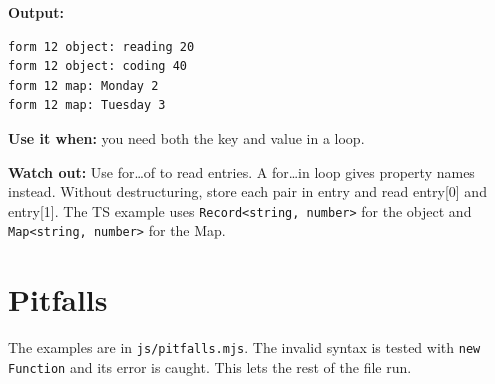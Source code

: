 \documentclass[
  10pt,
  a4paper,
]{article}
\begin{document}

\textbf{Output:}

\begin{minipage}{\linewidth}

\begin{lstlisting}
form 12 object: reading 20
form 12 object: coding 40
form 12 map: Monday 2
form 12 map: Tuesday 3
\end{lstlisting}

\end{minipage}\par

\textbf{Use it when:} you need both the key and value in a loop.

\textbf{Watch out:} Use for\ldots of to read entries. A for\ldots in
loop gives property names instead. Without destructuring, store each
pair in entry and read entry{[}0{]} and entry{[}1{]}. The TS example
uses \texttt{Record<string, number>} for the object and
\texttt{Map<string, number>} for the Map.

\section{Pitfalls}\label{pitfalls}

The examples are in \texttt{js/\allowbreak{}pitfalls.\allowbreak{}mjs}.
The invalid syntax is tested with \texttt{new Function} and its error is
caught. This lets the rest of the file run.
\end{document}
